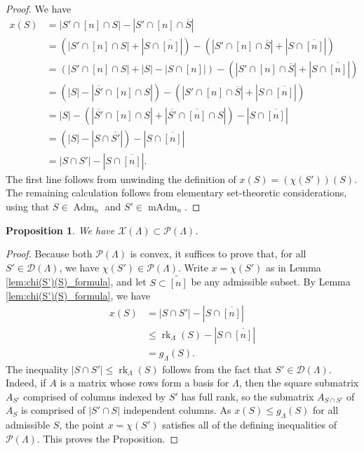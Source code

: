 \documentclass[12pt]{amsart}
\newtheorem{proposition}[definition]{Proposition}
\DeclareMathOperator{\Adm}{Adm}
\DeclareMathOperator{\rk}{rk}
\DeclareMathOperator{\mAdm}{mAdm}
\newcommand{\cD}{\mathcal{D}}
\newcommand{\cP}{\mathcal{P}}
\newcommand{\cX}{\mathcal{X}}
\newcommand{\wtn}{\widetilde{[n]}}
\begin{document}
\begin{proof}
 We have 
    \begin{align*}
        x(S) &= |S' \cap [n] \cap S | - | S' \cap[n] \cap \overline{S}|\\
        &=(|S' \cap [n] \cap S |+|S\cap \overline{[n]}|)-(| S' \cap[n] \cap \overline{S}|+|S\cap \overline{[n]}|)\\
        &=(|S' \cap [n] \cap S |+|S|-|S\cap [n]|)-(| S' \cap[n] \cap \overline{S}|+|S\cap \overline{[n]}|)\\
        &=(| S | - | \overline{S'}\cap[n]\cap S |)-(| S' \cap[n] \cap \overline{S}|+|S\cap \overline{[n]}|)\\
        &=| S | - (| \overline{S'}\cap[n]\cap S |+| \overline{S'} \cap\overline{[n]} \cap S|)-|S\cap \overline{[n]}|\\
        &=(| S | - |S\cap \overline{S'}|)-|S\cap \overline{[n]}|\\
        &=|S\cap S'|-|S\cap \overline{[n]}|.
    \end{align*}
    The first line follows from unwinding the definition of $x(S)=(\chi(S'))(S)$. The remaining calculation follows from elementary set-theoretic considerations, using that $S\in\Adm_n$ and $S'\in\mAdm_n$.
\end{proof}

\begin{proposition}\label{prop:X_in_P}
We have $\cX(\Lambda)\subset\cP(\Lambda)$.
\end{proposition}

\begin{proof}
    Because both $\cP(\Lambda)$ is convex, it suffices to prove that, for all $S'\in \cD(\Lambda)$, we have $\chi(S')\in \cP(\Lambda)$. Write $x=\chi(S')$ as in Lemma \ref{lem:chi(S')(S)_formula}, and let $S\subset\wtn$ be any admissible subset. By Lemma \ref{lem:chi(S')(S)_formula}, we have
    \begin{align*}
        x(S) &= |S\cap S'|-|S\cap \overline{[n]}|\\
        &\le\rk_{\Lambda}(S)-|S\cap \overline{[n]}|\\
        &=g_\Lambda(S).
    \end{align*}
The inequality $|S\cap S'|\le \rk_\Lambda(S)$ follows from the fact that $S'\in\cD(\Lambda)$. Indeed, if $A$ is a matrix whose rows form a basis for $\Lambda$, then the square submatrix $A_{S'}$ comprised of columns indexed by $S'$ has full rank, so the submatrix $A_{S\cap S'}$ of $A_S$ is comprised of $|S'\cap S|$ independent columns. As $x(S)\le g_\Lambda(S)$ for all admissible $S$, the point $x=\chi(S')$ satisfies all of the defining inequalities of $\cP(\Lambda)$. This proves the Proposition.
\end{proof}
\end{document}
